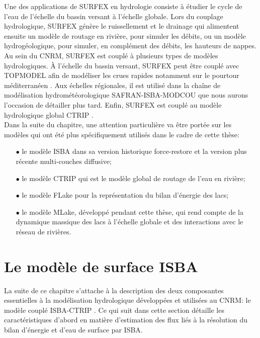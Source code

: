 \clearpage

Une des applications de SURFEX en hydrologie consiste à étudier le cycle de l'eau de l'échelle du bassin versant à l'échelle globale. Lors du couplage hydrologique, SURFEX génère le ruissellement et le drainage qui alimentent ensuite un modèle de routage en rivière, pour simuler les débits, ou un modèle hydrogéologique, pour simuler, en complément des débits, les hauteurs de nappes. Au sein du CNRM, SURFEX est couplé à plusieurs types de modèles hydrologiques. À l'échelle du bassin versant, SURFEX peut être couplé avec TOPMODEL afin de modéliser les crues rapides notamment sur le pourtour méditerranéen \citep{vincendon2010}. Aux échelles régionales, il est utilisé dans la chaîne de modélisation hydrométéorologique SAFRAN-ISBA-MODCOU que nous aurons l'occasion de détailler plus tard. Enfin, SURFEX est couplé au modèle hydrologique global CTRIP \citep{decharme2007}. \\

\noindent Dans la suite du chapitre, une attention particulière va être portée sur les modèles qui ont été plus spécifiquement utilisés dans le cadre de cette thèse:

\begin{itemize}
\medbreak
\item[$\bullet$] le modèle ISBA dans sa version historique force-restore et la version plus récente multi-couches diffusive;
\medbreak
\item[$\bullet$] le modèle CTRIP qui est le modèle global de routage de l'eau en rivière;
\medbreak
\item[$\bullet$] le modèle FLake pour la représentation du bilan d'énergie des lacs;
\medbreak
\item[$\bullet$] le modèle MLake, développé pendant cette thèse, qui rend compte de la dynamique massique des lacs à l'échelle globale et des interactions avec le réseau de rivières.
\medbreak
\end{itemize}
\section{{\selectfont Le modèle de surface ISBA}}
\label{sec:isba}

La suite de ce chapitre s'attache à la description des deux composantes essentielles à la modélisation hydrologique développées et utilisées au CNRM: le modèle couplé ISBA-CTRIP \citep{decharme2007}. Ce qui suit dans cette section détaille les caractéristiques d'abord en matière d'estimation des flux liés à la résolution du bilan d'énergie et d'eau de surface par ISBA.\\

